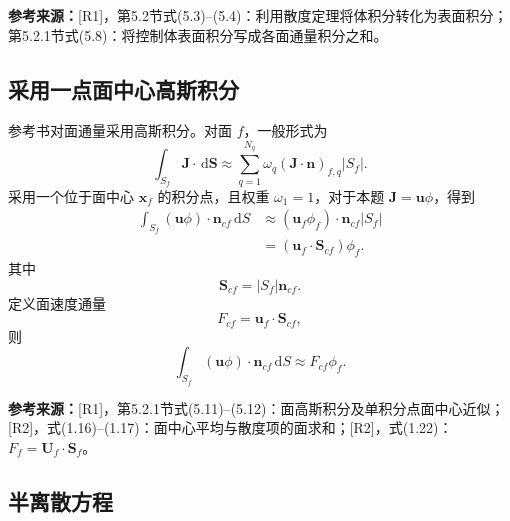 \documentclass[UTF8,12pt,a4paper]{ctexart}
\numberwithin{equation}{section}
\newcommand{\Rone}{\textnormal{[R1]}}
\newcommand{\Rtwo}{\textnormal{[R2]}}
\newcommand{\source}[1]{%
  \par\smallskip
  \noindent\colorbox{sourcebg}{%
    \parbox{0.955\linewidth}{\footnotesize\color{sourcegray}\textbf{参考来源：}#1}%
  }
  \par\smallskip
}
\newcommand{\dd}{\,\mathrm d}
\begin{document}
\source{\Rone，第5.2节式(5.3)--(5.4)：利用散度定理将体积分转化为表面积分；第5.2.1节式(5.8)：将控制体表面积分写成各面通量积分之和。}

\subsection{采用一点面中心高斯积分}

参考书对面通量采用高斯积分。对面 $f$，一般形式为
\begin{equation}
  \int_{S_f}\bm J\cdot\dd\bm S
  \approx
  \sum_{q=1}^{N_q}\omega_q
  (\bm J\cdot\bm n)_{f,q}|S_f|.
  \label{eq:face_gauss_general}
\end{equation}
采用一个位于面中心 $\bm x_f$ 的积分点，且权重 $\omega_1=1$，对于本题 $\bm J=\bm u\phi$，得到
\begin{align}
  \int_{S_f}(\bm u\phi)\cdot\bm n_{cf}\dd S
  &\approx(\bm u_f\phi_f)\cdot\bm n_{cf}|S_f|
  \label{eq:midpoint1}\\
  &=(\bm u_f\cdot\bm S_{cf})\phi_f.
  \label{eq:midpoint2}
\end{align}
其中
\begin{equation}
  \bm S_{cf}=|S_f|\bm n_{cf}.
  \label{eq:area_vector}
\end{equation}
定义面速度通量
\begin{equation}
  \boxed{F_{cf}=\bm u_f\cdot\bm S_{cf}},
  \label{eq:face_flux_local}
\end{equation}
则
\begin{equation}
  \int_{S_f}(\bm u\phi)\cdot\bm n_{cf}\dd S
  \approx F_{cf}\phi_f.
  \label{eq:flux_approx}
\end{equation}

\source{\Rone，第5.2.1节式(5.11)--(5.12)：面高斯积分及单积分点面中心近似；\Rtwo，式(1.16)--(1.17)：面中心平均与散度项的面求和；\Rtwo，式(1.22)：$F_f=\bm U_f\cdot\bm S_f$。}

\subsection{半离散方程}
\end{document}
